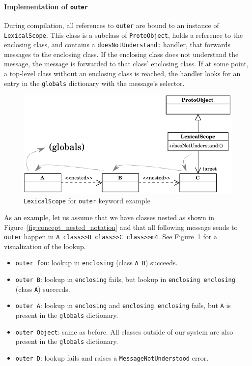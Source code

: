 \paragraph{Implementation of \texttt{outer}}
During compilation, all references to \texttt{outer} are bound to an instance of \texttt{LexicalScope}. This class is a subclass of \texttt{ProtoObject}, holds a reference to the enclosing class, and contains a \texttt{doesNotUnderstand:} handler, that forwards messages to the enclosing class. If the enclosing class does not understand the message, the message is forwarded to that class' enclosing class. If at some point, a top-level class without an enclosing class is reached, the handler looks for an entry in the \texttt{globals} dictionary with the message's selector.

\begin{figure}[!htp]
	\includegraphics[scale=1]{lexical_outer.pdf}
	\centering
	\caption{\texttt{LexicalScope} for \texttt{outer} keyword example}
	\label{impl:lex_outer}
\end{figure}

As an example, let us assume that we have classes nested as shown in Figure~\ref{fig:concept_nested_notation} and that all following message sends to \texttt{outer} happen in \texttt{A class>>B class>>C class>>m4}. See Figure~\ref{impl:lex_outer} for a visualization of the lookup.
\begin{itemize}
	\item \texttt{outer foo}: lookup in \texttt{enclosing} (class \texttt{A B}) succeeds.
	\item \texttt{outer B}: lookup in \texttt{enclosing} fails, but lookup in \texttt{enclosing enclosing} (class \texttt{A}) succeeds.
	\item \texttt{outer A}: lookup in \texttt{enclosing} and \texttt{enclosing enclosing} fails, but \texttt{A} is present in the \texttt{globals} dictionary.
	\item \texttt{outer Object}: same as before. All classes outside of our system are also present in the \texttt{globals} dictionary.
	\item \texttt{outer D}: lookup fails and raises a \texttt{MessageNotUnderstood} error.
\end{itemize}

